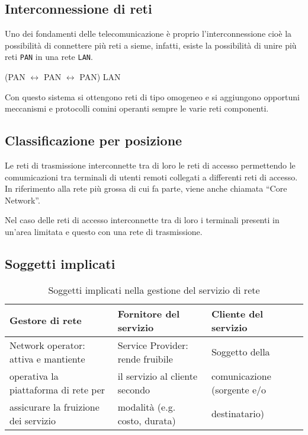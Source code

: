 \subsection{Interconnessione di reti}
\label{sec:interdireti}
Uno dei fondamenti delle telecomunicazione è proprio l'interconnessione cioè la
possibilità di connettere più reti a sieme, infatti, esiste la possibilità di unire
più reti {\tt PAN} in una rete {\tt LAN}.
\begin{center}
  (PAN $\longleftrightarrow$ PAN $\longleftrightarrow$ PAN) LAN
\end{center}
Con questo sistema si ottengono reti di tipo omogeneo e si aggiungono opportuni
meccanismi e protocolli comini operanti sempre le varie reti componenti.

\subsection{Classificazione per posizione}
\label{sec:classperposiz}

Le reti di trasmissione interconnette tra di loro le reti di accesso permettendo le
comumicazioni tra terminali di utenti remoti collegati a differenti reti di accesso.
In riferimento alla rete più grossa di cui fa parte, viene anche chiamata
``Core Network''.
\begin{center}
\end{center}
Nel caso delle reti di accesso interconnette tra di loro i terminali presenti in un'area
limitata e questo con una rete di trasmissione.

\subsection{Soggetti implicati}
\label{sec:soggimp}

\begin{table}[ht]
  \centering
  \begin{tabular}{lll}
    \textbf{Gestore di rete}&\textbf{Fornitore del servizio}&\textbf{Cliente del servizio}\\\hline
    Network operator: attiva e mantiente & Service Provider: rende fruibile & Soggetto della \\
    operativa la piattaforma di rete per & il servizio al cliente secondo & comunicazione (sorgente e/o\\
    assicurare la fruizione dei servizio & modalità (e.g. costo, durata) & destinatario)
  \end{tabular}
  \caption{Soggetti implicati nella gestione del servizio di rete}
  \label{tab:sggimp}
\end{table}

